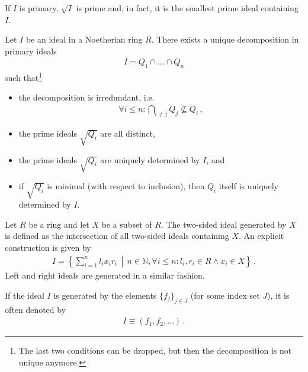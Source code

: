    \begin{property}
        If $I$ is primary, $\sqrt{I}$ is prime and, in fact, it is the smallest prime ideal containing $I$.
    \end{property}
    \begin{theorem}\label{algebra:lasker_noether}
        Let $I$ be an ideal in a Noetherian ring $R$. There exists a unique decomposition in primary ideals
        \begin{gather}
            I = Q_1\cap\ldots\cap Q_n
        \end{gather}
        such that\footnote{The last two conditions can be dropped, but then the decomposition is not unique anymore.}
        \begin{itemize}
            \item the decomposition is irredundant, i.e.
            \begin{gather}
                \forall i\leq n: \bigcap_{i\neq j}Q_j\not\subseteq Q_i\,,
            \end{gather}
            \item the prime ideals $\sqrt{Q_i}$ are all distinct,
            \item the prime ideals $\sqrt{Q_i}$ are uniquely determined by $I$, and
            \item if $\sqrt{Q_i}$ is minimal (with respect to inclusion), then $Q_i$ itself is uniquely determined by $I$.
        \end{itemize}
    \end{theorem}

    \begin{construct}\label{algebra:generating_set_ideal}
        Let $R$ be a ring and let $X$ be a subset of $R$. The two-sided ideal generated by $X$ is defined as the intersection of all two-sided ideals containing $X$. An explicit construction is given by
        \begin{gather}
            I = \left\{\sum_{i=1}^n l_ix_ir_i\,\middle\vert\,n\in\mathbb{N}, \forall i\leq n:l_i,r_i\in R\land x_i\in X\right\}\,.
        \end{gather}
        Left and right ideals are generated in a similar fashion.
    \end{construct}
    \begin{notation}
        If the ideal $I$ is generated by the elements $\{f_j\}_{j\in J}$ (for some index set $J$), it is often denoted by
        \begin{gather}
            I\equiv(f_1,f_2,\ldots)\,.
        \end{gather}
    \end{notation}

